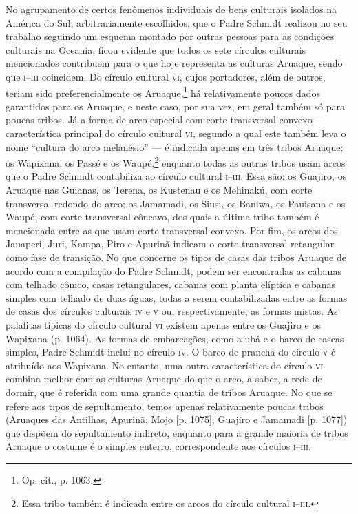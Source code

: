 No agrupamento de certos fenômenos individuais de bens culturais
isolados na América do Sul, arbitrariamente escolhidos, que o Padre
Schmidt realizou no seu trabalho seguindo um esquema montado por outras
pessoas para as condições culturais na Oceania, ficou evidente que
todos os sete círculos culturais mencionados contribuem para o que hoje
representa as culturas Aruaque, sendo que \textsc{i--iii} coincidem. Do círculo
cultural \textsc{vi}, cujos portadores, além de outros, teriam sido
preferencialmente os Aruaque,\footnote{Op. cit., p. 1063.} há
relativamente poucos dados garantidos para os Aruaque, e neste caso,
por sua vez, em geral também só para poucas tribos. Já a forma de arco
especial com corte transversal convexo --- característica principal do
círculo cultural \textsc{vi}, segundo a qual este também leva o nome ``cultura do
arco melanésio'' --- é indicada apenas em três tribos Aruaque: os
Wapixana, os Passé e os Waupé,\footnote{Essa tribo também é indicada
  entre os arcos do círculo cultural \textsc{i--iii}.} enquanto todas as outras
tribos usam arcos que o Padre Schmidt contabiliza ao círculo cultural
\textsc{i--iii}. Essa são: os Guajiro, os Aruaque nas Guianas, os Terena, os
Kustenau e os Mehinakú, com corte transversal redondo do arco; os
Jamamadi, os Siusi, os Baniwa, os Pauisana e os Waupé, com corte
transversal côncavo, dos quais a última tribo também é mencionada entre
as que usam corte transversal convexo. Por fim, os arcos dos Jauaperi,
Juri, Kampa, Piro e Apurinã indicam o corte transversal retangular como
fase de transição. No que concerne os tipos de casas das tribos Aruaque
de acordo com a compilação do Padre Schmidt, podem ser encontradas as
cabanas com telhado cônico, casas retangulares, cabanas com planta
elíptica e cabanas simples com telhado de duas águas, todas a serem
contabilizadas entre as formas de casas dos círculos culturais \textsc{iv} e \textsc{v}
ou, respectivamente, as formas mistas. As palafitas típicas do círculo
cultural \textsc{vi} existem apenas entre os Guajiro e os Wapixana (p. 1064). As
formas de embarcações, como a ubá e o barco de cascas simples, Padre
Schmidt inclui no círculo \textsc{iv}. O barco de prancha do círculo \textsc{v} é
atribuído aos Wapixana. No entanto, uma outra característica do círculo
\textsc{vi} combina melhor com as culturas Aruaque do que o arco, a saber, a rede
de dormir, que é referida com uma grande quantia de tribos Aruaque. No
que se refere aos tipos de sepultamento, temos apenas relativamente
poucas tribos (Aruaques das Antilhas, Apurinã, Mojo {[}p. 1075{]},
Guajiro e Jamamadi {[}p. 1077{]}) que dispõem do sepultamento indireto,
enquanto para a grande maioria de tribos Aruaque o costume é o simples
enterro, correspondente aos círculos \textsc{i--iii}.

